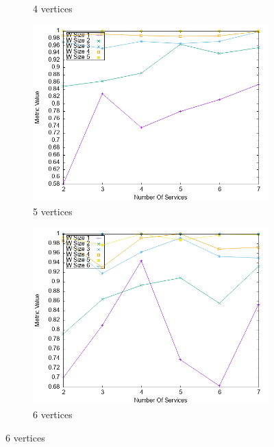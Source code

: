 \begin{figure}[ht]
\begin{subfigure}{0.33\textwidth}
    \caption{4 vertices}
    \label{fig:quality_window_perce_wide_4n}
  \end{subfigure}
  \hfill
  \begin{subfigure}{0.33\textwidth}
    \includegraphics[width=\textwidth]{Images/graphs/newwindow_quality_performance_diff_perce_n7_s7_20_100_n5}
    \caption{5 vertices}
    \label{fig:quality_window_perce_wide_5n}
  \end{subfigure}
  \hfill
  \begin{subfigure}{0.33\textwidth}
    \includegraphics[width=\textwidth]{Images/graphs/newwindow_quality_performance_diff_perce_n7_s7_20_100_n6}
    \caption{6 vertices}
    \label{fig:quality_window_perce_wide_6n}
  \end{subfigure}

\end{figure}

